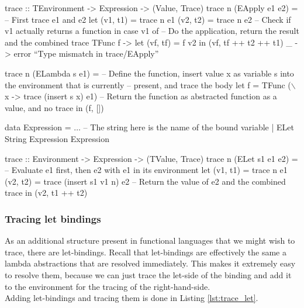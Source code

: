         \begin{haskell}[caption=Tracing away functions, label=lst:trace_func, gobble=12]
            trace :: TEnvironment -> Expression -> (Value, Trace)
            trace n (EApply e1 e2) =
                -- First trace e1 and e2
                let (v1, t1) = trace n e1
                    (v2, t2) = trace n e2
                -- Check if v1 actually returns a function
                in  case v1 of
                    -- Do the application, return the result and the combined trace
                    TFunc f -> let (vf, tf) = f v2
                               in  (vf, tf ++ t2 ++ t1)
                    _       -> error ``Type mismatch in trace/EApply''
            
            trace n (ELambda s e1) =
                -- Define the function, insert value x as variable s into the environment that is currently 
                -- present, and trace the body
                let f = TFunc ($\backslash$x -> trace (insert s x) e1)
                -- Return the function as abstracted function as a value, and no trace
                in  (f, [])
        \end{haskell}

        \clearpage
        \begin{haskell}[caption=Tracing let bindings, label=lst:trace_let, gobble=12]
            data Expression
                = $\ldots$
                -- The string here is the name of the bound variable
                | ELet String Expression Expression

            trace :: Environment -> Expression -> (TValue, Trace)
            trace n (ELet s1 e1 e2) =
                -- Evaluate e1 first, then e2 with e1 in its environment
                let (v1, t1) = trace n e1
                    (v2, t2) = trace (insert s1 v1 n) e2
                -- Return the value of e2 and the combined trace
                in  (v2, t1 ++ t2)
        \end{haskell}

        \subsubsection{Tracing let bindings} \label{sec:structures}
            As an additional structure present in functional languages that we might wish to trace, there are let-bindings.
            Recall that let-bindings are effectively the same a lambda abstractions that are resolved immediately.
            This makes it extremely easy to resolve them, because we can just trace the let-side of the binding and add it to the environment for the tracing of the right-hand-side.\\
            Adding let-bindings and tracing them is done in Listing \ref{lst:trace_let}.  

